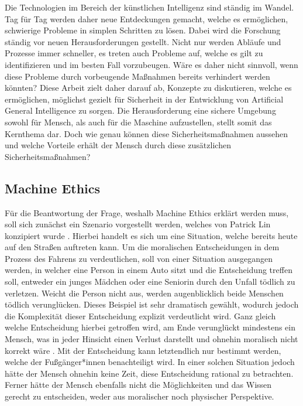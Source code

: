             Die Technologien im Bereich der künstlichen Intelligenz sind ständig im Wandel. Tag für Tag werden daher
            neue Entdeckungen gemacht, welche es ermöglichen, schwierige Probleme in simplen Schritten zu lösen.
            Dabei wird die Forschung ständig vor neuen Herausforderungen gestellt. Nicht nur werden Abläufe und Prozesse
            immer schneller, es treten auch Probleme auf, welche es gilt zu identifizieren und im besten Fall vorzubeugen.
            Wäre es daher nicht sinnvoll, wenn diese Probleme durch vorbeugende Maßnahmen bereits verhindert werden könnten?
            Diese Arbeit zielt daher darauf ab, Konzepte zu diskutieren, welche es ermöglichen, möglichst gezielt für
            Sicherheit in der Entwicklung von Artificial General Intelligence zu sorgen. Die Herausforderung eine sichere
            Umgebung sowohl für Mensch, als auch für die Maschine aufzustellen, stellt somit das Kernthema dar. Doch wie
            genau können diese Sicherheitsmaßnahmen aussehen und welche Vorteile erhält der Mensch durch diese zusätzlichen
            Sicherheitsmaßnahmen?

        \subsection{Machine Ethics}
            Für die Beantwortung der Frage, weshalb Machine Ethics erklärt werden muss, soll sich zunächst ein Szenario
            vorgestellt werden, welches von Patrick Lin konzipiert wurde \cite[s. 70]{maurer_gerdes_lenz_winner_2015}.
            Hierbei handelt es sich um eine Situation, welche bereits heute auf den Straßen auftreten kann. Um die
            moralischen Entscheidungen in dem Prozess des Fahrens zu verdeutlichen, soll von einer Situation ausgegangen
            werden, in welcher eine Person in einem Auto sitzt und die Entscheidung treffen soll, entweder ein junges
            Mädchen oder eine Seniorin durch den Unfall tödlich zu verletzen. Weicht die Person nicht aus, werden augenblicklich
            beide Menschen tödlich verunglücken. Dieses Beispiel ist sehr dramatisch gewählt, wodurch jedoch die Komplexität
            dieser Entscheidung explizit verdeutlicht wird. Ganz gleich welche Entscheidung hierbei getroffen wird, am
            Ende verunglückt mindestens ein Mensch, was in jeder Hinsicht einen Verlust darstellt und ohnehin moralisch
            nicht korrekt wäre \cite[s. 70]{maurer_gerdes_lenz_winner_2015}. Mit der Entscheidung kann letztendlich nur
            bestimmt werden, welche der Fußgänger*innen benachteiligt wird. In einer solchen Situation jedoch hätte der
            Mensch ohnehin keine Zeit, diese Entscheidung rational zu betrachten. Ferner hätte der Mensch ebenfalls nicht
            die Möglichkeiten und das Wissen gerecht zu entscheiden, weder aus moralischer noch physischer Perspektive.

